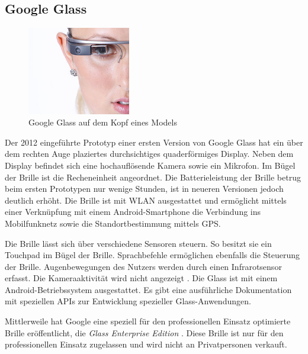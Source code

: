 \subsection{Google Glass}
%
\begin{figure}[htbp]
    \centering
    \includegraphics[width=0.4\textwidth]{data/bilder/Google_Glass_Model_zugeschnitten.png}
    \caption{Google Glass auf dem Kopf eines Models \cite{Reckmann2014}}
    \label{fig:GlassModel}
\end{figure}
%
Der 2012 eingeführte Prototyp einer ersten Version von Google Glass hat ein über dem rechten Auge plaziertes durchsichtiges quaderförmiges Display. Neben dem Display befindet sich eine hochauflösende Kamera sowie ein Mikrofon. Im Bügel der Brille ist die Recheneinheit angeordnet. Die Batterieleistung der Brille betrug beim ersten Prototypen nur wenige Stunden, ist in neueren Versionen jedoch deutlich erhöht. Die Brille ist mit WLAN ausgestattet und ermöglicht mittels einer Verknüpfung mit einem Android-Smartphone die Verbindung ins Mobilfunknetz sowie die Standortbestimmung mittels GPS.

Die Brille lässt sich über verschiedene Sensoren steuern. So besitzt sie ein Touchpad im Bügel der Brille. Sprachbefehle ermöglichen ebenfalls die Steuerung der Brille. Augenbewegungen des Nutzers werden durch einen Infrarotsensor erfasst. Die Kameraaktivität wird nicht angezeigt \cite[S.~30]{Schwenke2016}. Die Glass ist mit einem Android-Betriebssystem ausgestattet. Es gibt eine ausführliche Dokumentation mit speziellen APIs zur Entwicklung spezieller Glass-Anwendungen.

Mittlerweile hat Google eine speziell für den professionellen Einsatz optimierte Brille eröffentlicht, die \emph{Glass Enterprise Edition} \cite{Inc.2018}. Diese Brille ist nur für den professionellen Einsatz zugelassen und wird nicht an Privatpersonen verkauft.
%
